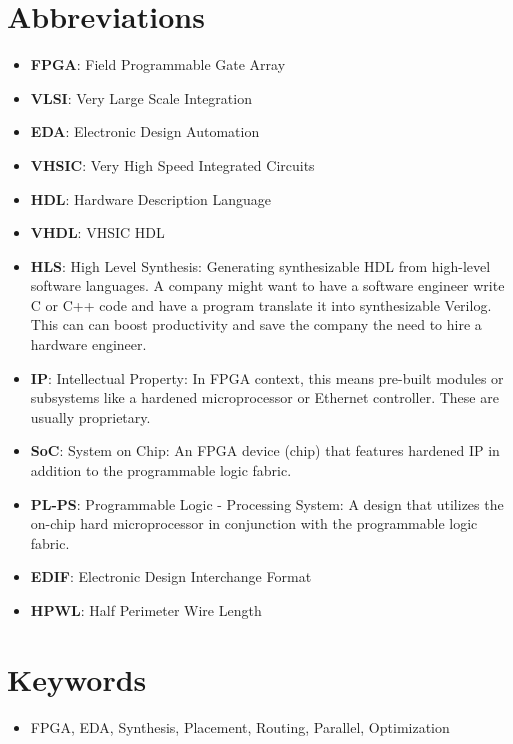 \documentclass{article}
\begin{document}
\section{Abbreviations}
\begin{itemize}[label={--}, left=0.25cm]
    \item \textbf{FPGA}: Field Programmable Gate Array
    \item \textbf{VLSI}: Very Large Scale Integration
    \item \textbf{EDA}: Electronic Design Automation
    \item \textbf{VHSIC}: Very High Speed Integrated Circuits
    \item \textbf{HDL}: Hardware Description Language
    \item \textbf{VHDL}: VHSIC HDL
    \item \textbf{HLS}: High Level Synthesis: Generating synthesizable HDL from high-level software languages. A company might want to have a software engineer write C or C++ code and have a program translate it into synthesizable Verilog. This can can boost productivity and save the company the need to hire a hardware engineer.
    \item \textbf{IP}: Intellectual Property: In FPGA context, this means pre-built modules or subsystems like a hardened microprocessor or Ethernet controller. These are usually proprietary.
    \item \textbf{SoC}: System on Chip: An FPGA device (chip) that features hardened IP in addition to the programmable logic fabric.
    \item \textbf{PL-PS}: Programmable Logic - Processing System: A design that utilizes the on-chip hard microprocessor in conjunction with the programmable logic fabric.
    \item \textbf{EDIF}: Electronic Design Interchange Format
    \item \textbf{HPWL}: Half Perimeter Wire Length
\end{itemize}

\section{Keywords}
\begin{itemize}
    \item FPGA, EDA, Synthesis, Placement, Routing, Parallel, Optimization
\end{itemize}
\end{document}
